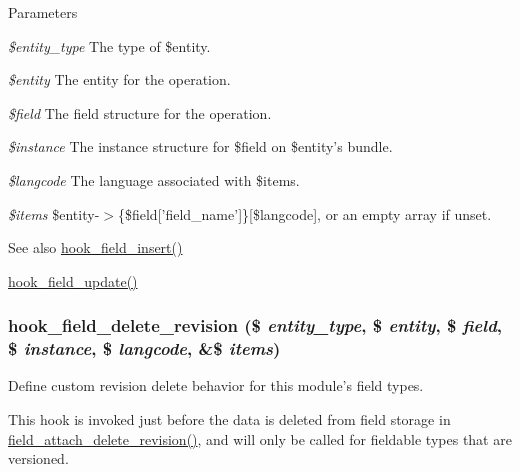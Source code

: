 \begin{DoxyParams}{Parameters}
\item[{\em \$entity\_\-type}]The type of \$entity. \item[{\em \$entity}]The entity for the operation. \item[{\em \$field}]The field structure for the operation. \item[{\em \$instance}]The instance structure for \$field on \$entity's bundle. \item[{\em \$langcode}]The language associated with \$items. \item[{\em \$items}]\$entity-\/$>$\{\$field\mbox{[}'field\_\-name'\mbox{]}\}\mbox{[}\$langcode\mbox{]}, or an empty array if unset.\end{DoxyParams}
\begin{DoxySeeAlso}{See also}
\hyperlink{group__field__types_ga2d29ec2e4a47170d5aaaf41bdd4813df}{hook\_\-field\_\-insert()} 

\hyperlink{group__field__types_gaca5bc4f8ab69818f23783af24454d9c4}{hook\_\-field\_\-update()} 
\end{DoxySeeAlso}
\hypertarget{group__field__types_gaef667d4ba12f6fb9950876e6f4f63878}{
\subsubsection[{hook\_\-field\_\-delete\_\-revision}]{\setlength{\rightskip}{0pt plus 5cm}hook\_\-field\_\-delete\_\-revision (\$ {\em entity\_\-type}, \/  \$ {\em entity}, \/  \$ {\em field}, \/  \$ {\em instance}, \/  \$ {\em langcode}, \/  \&\$ {\em items})}}
\label{group__field__types_gaef667d4ba12f6fb9950876e6f4f63878}
Define custom revision delete behavior for this module's field types.

This hook is invoked just before the data is deleted from field storage in \hyperlink{group__field__attach_gaa9eae65e6d9f1996cb27a55ba25b56e9}{field\_\-attach\_\-delete\_\-revision()}, and will only be called for fieldable types that are versioned.



